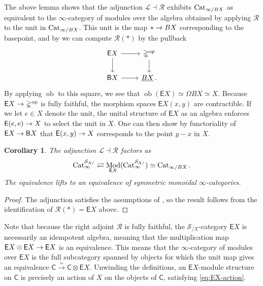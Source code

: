\documentclass[10pt]{amsart}
\numberwithin{equation}{section}
\newtheorem{cor}[prop]{Corollary}
\theoremstyle{definition}
\DeclareMathOperator{\Mod}{Mod}
\DeclareMathOperator{\ob}{ob}
\DeclareMathOperator{\op}{op}
\newcommand{\Cat}{\mathrm{Cat}\vphantom{t}}
\newcommand{\Simp}{\mathbb{\Delta}}
\newcommand{\cS}{\mathcal{S}}
\newcommand{\cL}{\mathcal{L}}
\newcommand{\cR}{\mathcal{R}}
\newcommand{\sfB}{\mathsf{B}}
\newcommand{\sfC}{\mathsf{C}}
\newcommand{\sfE}{\mathsf{E}}
\renewcommand{\to}{\mathchoice{\longrightarrow}{\rightarrow}{}{}}
\begin{document}
	The above lemma shows that the adjunction $\cL \dashv \cR$ exhibits $\Cat_{\infty/BX}$ as equivalent to the $\infty$-category of modules over the algebra obtained by applying $\cR$ to the unit in $\Cat_{\infty /BX}$. This unit is the map $\ast \to BX$ corresponding to the basepoint, and by  we can compute $\cR(\ast)$ by the pullback
	\begin{equation*}
		\begin{tikzcd}
			\sfE X \arrow[r] \arrow[d]      &   \Simp^{\op}  \arrow[d] \\
			\sfB X  \arrow[r]               &   \underline{BX} \,.
		\end{tikzcd}
	\end{equation*}
	By applying $\ob$ to this square, we see that $\ob(\sfE X) \simeq \Omega BX \simeq X$.
  Because $\sfE X \to \Simp^{\op}$ is fully faithful, the morphism spaces $\sfE X(x,y)$ are contractible.
  If we let $e\in X$ denote the unit, the unital structure of $\sfE X$ as an algebra enforces $\sfE(e,e) \to X$ to select the unit in $X$.
  One can then show by functoriality of $\sfE X \to \sfB X$ that $\sfE(x,y) \to X$ corresponds to the point $y-x$ in $X$.

	\begin{cor}\label{cor:monoid_equivalence}
		The adjunction $\cL \dashv \cR$ factors as
		\begin{align*}
			\Cat^{\cS_{X/}}_{\infty} \rightleftarrows \Mod_{\sfE X} (\Cat^{\cS_{X/}}_{\infty}) \simeq \Cat_{\infty /BX} \,.
		\end{align*}
		The equivalence lifts to an equivalence of symmetric monoidal $\infty$-categories.
	\end{cor}

	\begin{proof}
		The adjunction satisfies the assumptions of \cite*[Proposition 5.29]{Mathew_2017}, so the result follows from the identification of $\cR(\ast) = \sfE X$ above.
	\end{proof}

	Note that because the right adjoint $\cR$ is fully faithful, the $\cS_{/X}$-category $\sfE X$ is necessarily an idempotent algebra, meaning that the multiplication map $\sfE X\otimes \sfE X \to \sfE X$ is an equivalence.
  This means that the $\infty$-category of modules over $\sfE X$ is the full subcategory spanned by objects for which the unit map gives an equivalence $\sfC \xrightarrow{\simeq} \sfC \otimes \sfE X$.
  Unwinding the definitions, an $\sfE X$-module structure on $\sfC$ is precisely an action of $X$ on the objects of $\sfC$, satisfying \eqref{eq:EX-action}.
\end{document}
